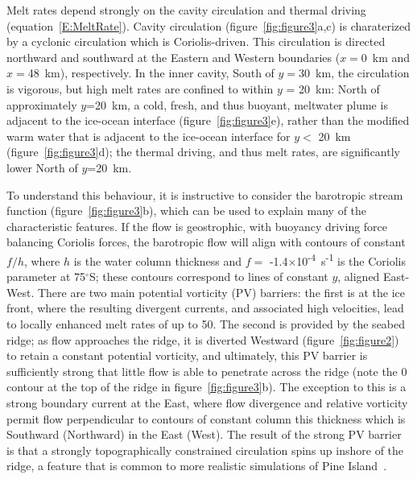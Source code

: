\documentclass[draft]{agujournal2019}
\begin{document}
Melt rates depend strongly on the cavity circulation and thermal driving (equation~\eqref{E:MeltRate}). Cavity circulation (figure~\ref{fig:figure3}a,c) is charaterized by a cyclonic circulation which is Coriolis-driven. This circulation is directed northward and southward at the Eastern and Western boundaries ($x=$0~km and $x=$48~km), respectively. In the inner cavity, South of $y = 30$~km, the circulation is vigorous, but high melt rates are confined to within $y$ = 20~km: North of approximately $y$=20~km, a cold, fresh, and thus buoyant, meltwater plume  is adjacent to the ice-ocean interface (figure~\ref{fig:figure3}e), rather than the modified warm water that is adjacent to the ice-ocean interface for $y < $ 20~km  (figure~\ref{fig:figure3}d); the thermal driving, and thus melt rates, are significantly lower North of $y$=20~km.


To understand this behaviour, it is instructive to consider the barotropic stream function (figure~\ref{fig:figure3}b), which can be used to explain many of the characteristic features. If the flow is geostrophic, with buoyancy driving force balancing Coriolis forces, the barotropic flow will align with contours of constant $f/h$, where $h$ is the water column thickness and $f =$ -1.4$\times$10\textsuperscript{-4}~s\textsuperscript{-1} is the Coriolis parameter at 75${}^\circ$S; these contours correspond to lines of constant $y$, aligned East-West. There are two main potential vorticity (PV) barriers: the first is at the ice front, where the resulting divergent currents, and associated high velocities, lead to locally enhanced melt rates of up to 50\mpryr. The second is provided by the seabed ridge; as flow approaches the ridge, it is diverted Westward (figure~\ref{fig:figure2}) to retain a constant potential vorticity, and ultimately, this PV barrier is sufficiently strong that little flow is able to penetrate across the ridge (note the 0 contour at the top of the ridge in figure~\ref{fig:figure3}b). The exception to this is a strong boundary current at the East, where flow divergence and relative vorticity permit flow perpendicular to contours of constant column this thickness which is Southward (Northward) in the East (West). The result of the strong PV barrier is that a strongly topographically constrained circulation spins up inshore of the ridge, a feature that is common to more realistic simulations of Pine Island~\cite{Heimbach2012AnnGlac, Dutrieux2014Science}.
\end{document}
